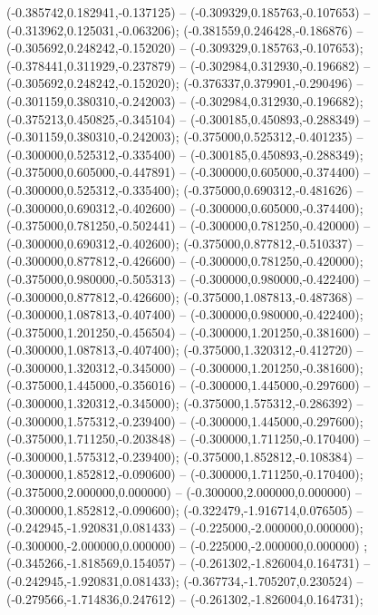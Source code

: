  (-0.385742,0.182941,-0.137125) -- (-0.309329,0.185763,-0.107653) -- (-0.313962,0.125031,-0.063206);
 (-0.381559,0.246428,-0.186876) -- (-0.305692,0.248242,-0.152020) -- (-0.309329,0.185763,-0.107653);
 (-0.378441,0.311929,-0.237879) -- (-0.302984,0.312930,-0.196682) -- (-0.305692,0.248242,-0.152020);
 (-0.376337,0.379901,-0.290496) -- (-0.301159,0.380310,-0.242003) -- (-0.302984,0.312930,-0.196682);
 (-0.375213,0.450825,-0.345104) -- (-0.300185,0.450893,-0.288349) -- (-0.301159,0.380310,-0.242003);
 (-0.375000,0.525312,-0.401235) -- (-0.300000,0.525312,-0.335400) -- (-0.300185,0.450893,-0.288349);
 (-0.375000,0.605000,-0.447891) -- (-0.300000,0.605000,-0.374400) -- (-0.300000,0.525312,-0.335400);
 (-0.375000,0.690312,-0.481626) -- (-0.300000,0.690312,-0.402600) -- (-0.300000,0.605000,-0.374400);
 (-0.375000,0.781250,-0.502441) -- (-0.300000,0.781250,-0.420000) -- (-0.300000,0.690312,-0.402600);
 (-0.375000,0.877812,-0.510337) -- (-0.300000,0.877812,-0.426600) -- (-0.300000,0.781250,-0.420000);
 (-0.375000,0.980000,-0.505313) -- (-0.300000,0.980000,-0.422400) -- (-0.300000,0.877812,-0.426600);
 (-0.375000,1.087813,-0.487368) -- (-0.300000,1.087813,-0.407400) -- (-0.300000,0.980000,-0.422400);
 (-0.375000,1.201250,-0.456504) -- (-0.300000,1.201250,-0.381600) -- (-0.300000,1.087813,-0.407400);
 (-0.375000,1.320312,-0.412720) -- (-0.300000,1.320312,-0.345000) -- (-0.300000,1.201250,-0.381600);
 (-0.375000,1.445000,-0.356016) -- (-0.300000,1.445000,-0.297600) -- (-0.300000,1.320312,-0.345000);
 (-0.375000,1.575312,-0.286392) -- (-0.300000,1.575312,-0.239400) -- (-0.300000,1.445000,-0.297600);
 (-0.375000,1.711250,-0.203848) -- (-0.300000,1.711250,-0.170400) -- (-0.300000,1.575312,-0.239400);
 (-0.375000,1.852812,-0.108384) -- (-0.300000,1.852812,-0.090600) -- (-0.300000,1.711250,-0.170400);
 (-0.375000,2.000000,0.000000) -- (-0.300000,2.000000,0.000000) -- (-0.300000,1.852812,-0.090600);
 (-0.322479,-1.916714,0.076505) -- (-0.242945,-1.920831,0.081433) -- (-0.225000,-2.000000,0.000000);
 (-0.300000,-2.000000,0.000000) -- (-0.225000,-2.000000,0.000000) ;
 (-0.345266,-1.818569,0.154057) -- (-0.261302,-1.826004,0.164731) -- (-0.242945,-1.920831,0.081433);
 (-0.367734,-1.705207,0.230524) -- (-0.279566,-1.714836,0.247612) -- (-0.261302,-1.826004,0.164731);
